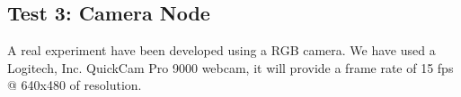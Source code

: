 \documentclass[journal,twoside]{JoPhA}
\begin{document}



% 
% 



\subsection{Test 3: Camera Node}


A real experiment have been developed using a RGB camera. We have used a Logitech, Inc. QuickCam Pro 9000 webcam, it will provide a frame rate of 15 fps @ 640x480 of resolution.
\end{document}
